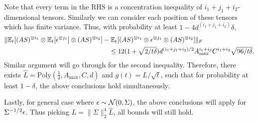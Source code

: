 Note that every term in the RHS is a concentration inequality of $i_1+j_1+i_2$-dimensional tensors. Similarly we can consider each position of these tensors which has finite variance.
Thus, with probability at least $1- 4d^{(i_1+j_1+i_2)}\delta$,   
\begin{align*}
\|\mathbb{E}_t[(AS)^{\otimes i_1}\otimes \mathbb{E}_t[\epsilon^{\otimes j_1}] \otimes (AS)^{\otimes i_2}] & - \mathbb{E}_t[(AS)^{\otimes i_1}\otimes \epsilon^{\otimes j_1}\otimes (AS)^{\otimes i_2}]  \|_F \\
& \quad \le
12(1+\sqrt{2/t\delta})d^{(i_1+j_1+i_2)/2}A_{\max}^{i_1+i_2}C^{i_1+i_2}\sqrt{96/t\delta}.  
\end{align*}
Similar argument will go through for the second inequality.
Therefore, there exists $\hat{L} = \text{Poly}(\frac{1}{\delta}, A_{\max}, C, d)$ and $g(t) = L/\sqrt{t}$, such that for probability at least $1-\delta$, the above conclusions hold simultaneously.

Lastly, for general case where $\epsilon\sim {\cal{N}}(0,\Sigma)$, the above conclusions will apply for $\Sigma^{-1/2}\epsilon$. Thus picking $L = \|\Sigma\|^4_2\hat{L}$, all bounds will still hold. 
